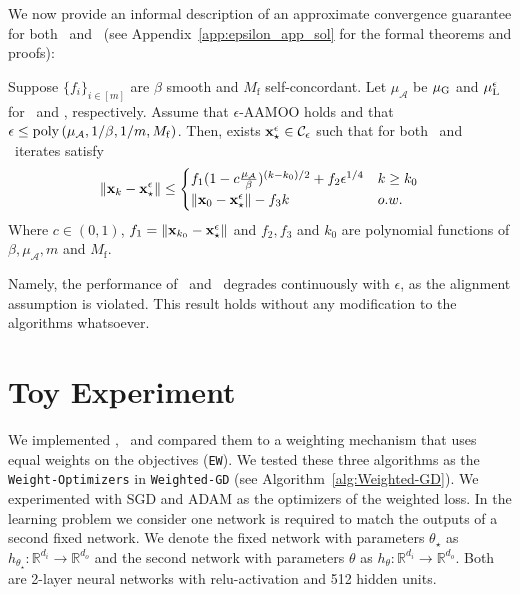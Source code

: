 We now provide an informal description of an approximate convergence guarantee for both \CAMOO\ and \PAMOO\ (see Appendix~\ref{app:epsilon_app_sol} for the formal theorems and proofs):
\begin{theorem}\label{thm:informal_epsilon_AAMOO} Suppose $\{ f_i\}_{i\in [m]}$ are $\beta$ smooth and $M_{\mathrm{f}}$ self-concordant. Let $\mu_{\mathcal{A}}$ be ${\mu_{\mathrm{G}}}$ and ${\mu_{\mathrm{L}}^\epsilon}$ for \CAMOO\ and \PAMOO, respectively. Assume that $\epsilon$-AAMOO holds and that $\epsilon \leq \mathrm{poly}\left( \mu_{\mathcal{A}},1/\beta,1/m,M_{\mathrm{f}}\right)$. Then, exists ${\mathbf{x}}_\star^\epsilon\in \mathcal{C}_\epsilon$ such that for both \CAMOO\ and \PAMOO\ iterates satisfy
\begin{align*}
\left\Vert{\mathbf{x}}_k - {\mathbf{x}}_\star^\epsilon\right\Vert \leq
    \begin{cases}
        f_1(1- c \frac{\mu_{\mathcal{A}}}{\beta})^{(k-k_0)/2} +f_2 \epsilon^{1/4} & k\geq k_0\\
         \left\Vert{\mathbf{x}}_0 - {\mathbf{x}}_\star^\epsilon\right\Vert - f_3 k & o.w.
    \end{cases}
\end{align*}
Where $c\in (0,1)$, $f_1 = \left\Vert{\mathbf{x}}_{k_0} - {\mathbf{x}}_\star^\epsilon\right\Vert$ and $f_2, f_3$ and $k_0$ are polynomial functions of $\beta, \mu_{\mathcal{A}},m$ and $M_{\mathrm{f}}.$ 
\end{theorem}
Namely, the performance of  \CAMOO\ and \PAMOO\ degrades continuously with $\epsilon$, as the alignment assumption is violated. This result holds without any modification to the algorithms whatsoever.  





\section{Toy Experiment}

We implemented \CAMOO, \PAMOO\ and compared them to a weighting mechanism that uses equal weights on the objectives (\texttt{EW}). We tested these three  algorithms as the \texttt{Weight-Optimizers} in \texttt{Weighted-GD} (see Algorithm~\ref{alg:Weighted-GD}). We experimented with SGD and ADAM as the optimizers of the weighted loss. In the learning problem we consider one network is required to match the outputs of a second fixed network. We denote the fixed network with parameters $\theta_\star$ as $h_{\theta_\star}: \mathbb{R}^{d_i}\rightarrow \mathbb{R}^{d_o}$ and the second network with parameters $\theta$ as $h_{\theta}:\mathbb{R}^{d_i}\rightarrow \mathbb{R}^{d_o}$. Both are 2-layer neural networks with relu-activation and 512 hidden units. 

